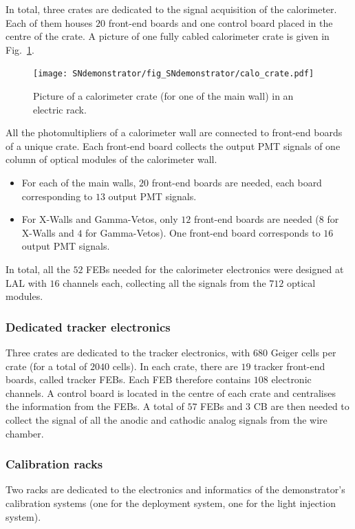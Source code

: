 In total, three crates are dedicated to the signal acquisition of the calorimeter.
Each of them houses $20$ front-end boards and one control board placed in the centre of the crate.
A picture of one fully cabled calorimeter crate is given in Fig.~\ref{fig:calo_crate}.
\begin{figure}[h]
  \centering
  \texttt{[image: SNdemonstrator/fig\_SNdemonstrator/calo\_crate.pdf]}
  \caption{Picture of a calorimeter crate (for one of the main wall) in an electric rack.
    \label{fig:calo_crate}}
\end{figure}
All the photomultipliers of a calorimeter wall are connected to front-end boards of a unique crate.
Each front-end board collects the output PMT signals of one column of optical modules of the calorimeter wall.
\begin{itemize}
\item For each of the main walls, $20$ front-end boards are needed, each board corresponding to $13$ output PMT signals.
\item For X-Walls and Gamma-Vetos, only $12$ front-end boards are needed ($8$ for X-Walls and $4$ for Gamma-Vetos).
  One front-end board corresponds to $16$ output PMT signals.
\end{itemize}
In total, all the $52$ FEBs needed for the calorimeter electronics were designed at LAL with $16$ channels each, collecting all the signals from the $712$ optical modules.

\subsubsection*{Dedicated tracker electronics}


Three crates are dedicated to the tracker electronics, with $680$ Geiger cells per crate (for a total of $2040$ cells).
In each crate, there are $19$ tracker front-end boards, called tracker FEBs.
Each FEB therefore contains $108$ electronic channels.
A control board is located in the centre of each crate and centralises the information from the FEBs.
A total of $57$ FEBs and $3$ CB are then needed to collect the signal of all the anodic and cathodic analog signals from the wire chamber.

\subsubsection*{Calibration racks}

Two racks are dedicated to the electronics and informatics of the demonstrator's calibration systems (one for the deployment system, one for the light injection system).


